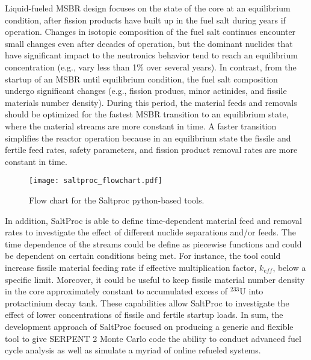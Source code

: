 Liquid-fueled \gls{MSBR} design focuses on the state of the core at an equilibrium condition, after fission products have built up in the fuel salt during years if operation. Changes in isotopic composition of the fuel salt continues encounter small changes even after decades of operation, but the dominant nuclides that have significant impact to the neutronics behavior tend to reach an equilibrium concentration (e.g., vary less than 1\% over several years). In contrast, from the startup of an \gls{MSBR} until equilibrium condition, the fuel salt composition undergo significant changes (e.g., fission producs, minor actinides, and fissile materials number density). During this period, the material feeds and removals should be optimized for the fastest \gls{MSBR} transition to an equilibrium state, where the material streams are more constant in time. A faster transition simplifies the reactor operation because in an equilibrium state the fissile and fertile feed rates, safety parameters, and fission product removal rates are more constant in time.

\begin{figure}[htp!] %
  \centering
  \vspace{-0.3em}
  \texttt{[image: saltproc\_flowchart.pdf]}
  \caption{Flow chart for the Saltproc python-based tools.}
  \vspace{-0.6em}
  \label{fig:saltproc_flow}
\end{figure}
\FloatBarrier

In addition, SaltProc is able to define time-dependent material feed and removal rates to investigate the effect of different nuclide separations and/or feeds. The time dependence of the streams could be define as piecewise functions and could be dependent on certain conditions being met. For instance, the tool could increase fissile material feeding rate if effective multiplication factor, $k_{eff}$, below a specific limit. Moreover, it could be useful to keep fissile material number density in the core approximately constant to accumulated excess of $^{233}$U into protactinium decay tank. These capabilities allow SaltProc to investigate the effect of lower concentrations of fissile and fertile startup loads. In sum, the development approach of SaltProc focused on producing a generic and flexible tool to give SERPENT 2 Monte Carlo code the ability to conduct advanced fuel cycle analysis as well as simulate a myriad of online refueled systems.
